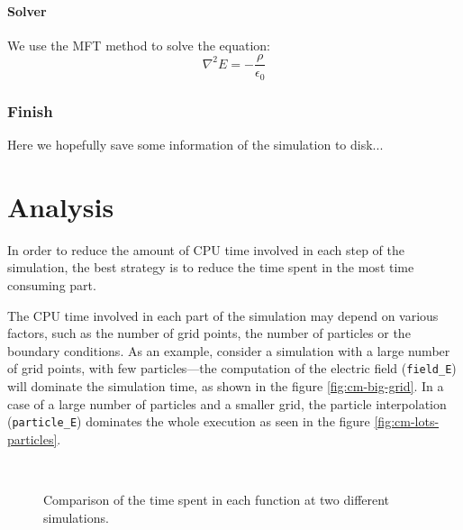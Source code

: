 \documentclass[a4paper]{report}
\begin{document}
\subsubsection{Solver}

We use the MFT method to solve the equation:
\begin{equation}
\nabla^2 E = - \frac{\rho}{\epsilon_0}
\end{equation}

\subsection{Finish}

Here we hopefully save some information of the simulation to disk...


\chapter{Analysis}


In order to reduce the amount of CPU time involved in each step of the 
simulation, the best strategy is to reduce the time spent in the most time 
consuming part.

The CPU time involved in each part of the simulation may depend on various 
factors, such as the number of grid points, the number of particles or the 
boundary conditions. As an example, consider a simulation with a large number of 
grid points, with few particles---the computation of the electric field 
(\texttt{field\_E}) will dominate the simulation time, as shown in the figure 
\ref{fig:cm-big-grid}. In a case of a large number of particles and a smaller 
grid, the particle interpolation (\texttt{particle\_E}) dominates the whole 
execution as seen in the figure \ref{fig:cm-lots-particles}.

\begin{figure}[h]
	\centering
	\\
	\caption{Comparison of the time spent in each function at two different 
	simulations.}
\end{figure}
\end{document}
